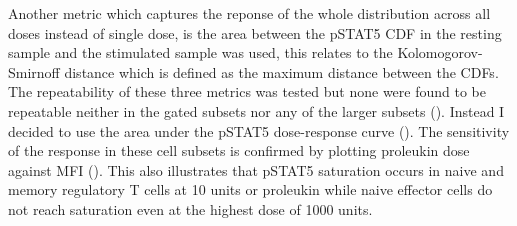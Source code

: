 Another metric which captures the reponse of the whole distribution across all doses instead of single dose,
is the area between the pSTAT5 CDF in the resting sample and the stimulated sample was used,
this relates to the Kolomogorov-Smirnoff distance which is defined as the maximum distance between the CDFs.
The repeatability of these three metrics was tested but none were found to be repeatable neither in the gated subsets nor any of the larger subsets ().
Instead I decided to use the area under the pSTAT5 dose-response curve ().
The sensitivity of the response in these cell subsets is confirmed by plotting proleukin dose against MFI ().
This also illustrates that pSTAT5 saturation occurs in naive and memory regulatory T cells at 10 units or proleukin while naive effector cells do not reach
saturation even at the highest dose of 1000 units.
%
